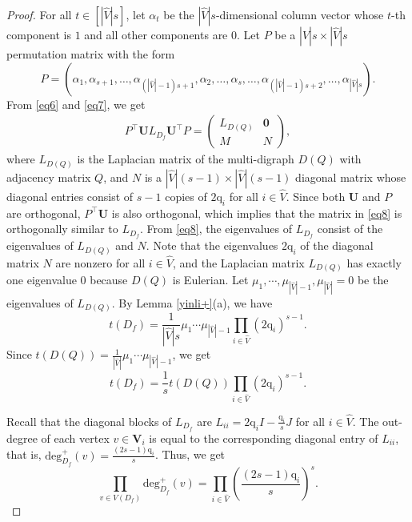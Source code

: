 \documentclass{article}
\begin{document}
\begin{proof}
For all $t \in [|\widehat{V}|s]$,
let $\alpha_{t}$ be the $|\widehat{V}|s$-dimensional column vector whose $t$-th component is $1$ and all other components are $0$.
Let $P$ be a $|\widehat{V}|s \times |\widehat{V}|s$ permutation matrix with the form $$P=\left(\alpha_{1},\alpha_{s+1},\ldots,\alpha_{(|\widehat{V}|-1)s+1},\alpha_{2},\ldots,\alpha_{s},\ldots,\alpha_{(|\widehat{V}|-1)s+2},\ldots,\alpha_{|\widehat{V}|s}\right).$$
From \eqref{eq6} and \eqref{eq7},
we get
\begin{align}\label{eq8}
P^{\top}\mathbf{U}L_{D_f}\mathbf{U}^{\top}P=\begin{pmatrix} L_{D(Q)} & \mathbf{0} \\ M & N \end{pmatrix},
\end{align}
where $L_{D(Q)}$ is the Laplacian matrix of the multi-digraph $D(Q)$ with adjacency matrix $Q$,
and $N$ is a $|\widehat{V}|(s-1) \times |\widehat{V}|(s-1)$ diagonal matrix whose diagonal entries consist of $s-1$ copies of $2\mathrm{q}_{i}$ for all $i \in \widehat{V}$.
Since both $\mathbf{U}$ and $P$ are orthogonal,
$P^{\top}\mathbf{U}$ is also orthogonal,
which implies that the matrix in \eqref{eq8} is orthogonally similar to $L_{D_f}$.
From \eqref{eq8},
the eigenvalues of $L_{D_f}$ consist of the eigenvalues of $L_{D(Q)}$ and $N$.
Note that the eigenvalues $2\mathrm{q}_{i}$ of the diagonal matrix $N$ are nonzero for all $i \in \widehat{V}$,
and the Laplacian matrix $L_{D(Q)}$ has exactly one eigenvalue $0$ because $D(Q)$ is Eulerian.
Let $\mu_{1},\cdots,\mu_{|\widehat{V}|-1},\mu_{|\widehat{V}|}=0$ be the eigenvalues of $L_{D(Q)}$.
By Lemma \ref{yinli+}(a),
we have $$t(D_f)=\frac{1}{|\widehat{V}|s}\mu_{1}\cdots\mu_{|\widehat{V}|-1}\prod_{i \in \widehat{V}}(2\mathrm{q}_{i})^{s-1}.$$
Since $t(D(Q))=\frac{1}{|\widehat{V}|}\mu_{1}\cdots\mu_{|\widehat{V}|-1}$,
we get
$$t(D_f)=\frac{1}{s}t(D(Q))\prod_{i \in \widehat{V}}(2\mathrm{q}_{i})^{s-1}.$$

Recall that the diagonal blocks of $L_{D_f}$ are $L_{ii}=2\mathrm{q}_{i}I-\frac{\mathrm{q}_{i}}{s}J$ for all $i \in \widehat{V}$.
The out-degree of each vertex $v \in \mathbf{V}_{i}$ is equal to the corresponding diagonal entry of $L_{ii}$,
that is, $\mathrm{deg}_{D_f}^{+}(v)=\frac{(2s-1)\mathrm{q}_{i}}{s}$.
Thus,
we get $$\prod_{v \in V(D_f)}\mathrm{deg}_{D_f}^{+}(v)=\prod_{i\in\widehat{V}}\left(\frac{(2s-1)\mathrm{q}_{i}}{s}\right)^{s}.$$
\end{proof}
\end{document}
